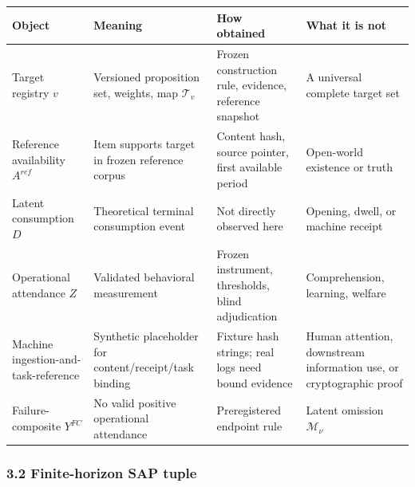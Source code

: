 \documentclass[
  11pt]{article}
\begin{document}
\begin{longtable}[]{@{}
  >{\raggedright\arraybackslash}p{}
  >{\raggedright\arraybackslash}p{}
  >{\raggedright\arraybackslash}p{}
  >{\raggedright\arraybackslash}p{}@{}}
\toprule\noalign{}
\begin{minipage}[b]{\linewidth}\raggedright
Object
\end{minipage} & \begin{minipage}[b]{\linewidth}\raggedright
Meaning
\end{minipage} & \begin{minipage}[b]{\linewidth}\raggedright
How obtained
\end{minipage} & \begin{minipage}[b]{\linewidth}\raggedright
What it is not
\end{minipage} \\
\midrule\noalign{}
\endhead
\bottomrule\noalign{}
\endlastfoot
Target registry \(v\) & Versioned proposition set, weights, map
\(\mathcal T_v\) & Frozen construction rule, evidence, reference
snapshot & A universal complete target set \\
Reference availability \(A^{ref}\) & Item supports target in frozen
reference corpus & Content hash, source pointer, first available period
& Open-world existence or truth \\
Latent consumption \(D\) & Theoretical terminal consumption event & Not
directly observed here & Opening, dwell, or machine receipt \\
Operational attendance \(Z\) & Validated behavioral measurement & Frozen
instrument, thresholds, blind adjudication & Comprehension, learning,
welfare \\
Machine ingestion-and-task-reference & Synthetic placeholder for
content/receipt/task binding & Fixture hash strings; real logs need
bound evidence & Human attention, downstream information use, or
cryptographic proof \\
Failure-composite \(Y^{FC}\) & No valid positive operational attendance
& Preregistered endpoint rule & Latent omission \(\mathcal M_\nu\) \\
\end{longtable}

\subsubsection{3.2 Finite-horizon SAP
tuple}\label{finite-horizon-sap-tuple}
\end{document}
